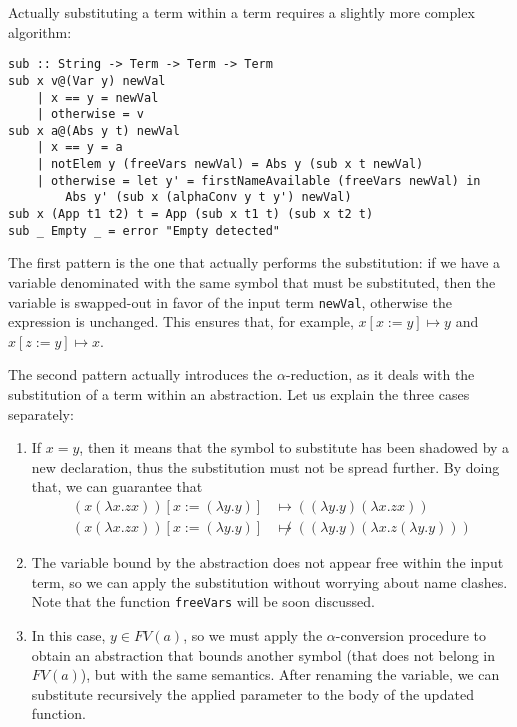 \documentclass{article}
\begin{document}
Actually substituting a term within a term requires a slightly more complex algorithm:

\begin{lstlisting}
sub :: String -> Term -> Term -> Term
sub x v@(Var y) newVal
    | x == y = newVal
    | otherwise = v
sub x a@(Abs y t) newVal
    | x == y = a
    | notElem y (freeVars newVal) = Abs y (sub x t newVal)
    | otherwise = let y' = firstNameAvailable (freeVars newVal) in
        Abs y' (sub x (alphaConv y t y') newVal)
sub x (App t1 t2) t = App (sub x t1 t) (sub x t2 t)
sub _ Empty _ = error "Empty detected"
\end{lstlisting}

The first pattern is the one that actually performs the substitution: if we have a variable denominated with the same symbol that must be substituted, then the variable is swapped-out in favor of the input term \lstinline|newVal|, otherwise the expression is unchanged. This ensures that, for example, $x[x:=y] \mapsto y$ and $x[z:=y] \mapsto x$.

The second pattern actually introduces the $\alpha$-reduction, as it deals with the substitution of a term within an abstraction. Let us explain the three cases separately:

\begin{enumerate}
    \item If $x=y$, then it means that the symbol to substitute has been shadowed by a new declaration, thus the substitution must not be spread further. By doing that, we can guarantee that
    \begin{align*}
        (x (\lambda x . z x))[x := (\lambda y . y)] &\mapsto ((\lambda y . y) (\lambda x . z x))\\
        (x (\lambda x . z x))[x := (\lambda y . y)] &\not \mapsto ((\lambda y . y) (\lambda x . z (\lambda y . y)))
    \end{align*}
    \item The variable bound by the abstraction does not appear free within the input term, so we can apply the substitution without worrying about name clashes. Note that the function \lstinline|freeVars| will be soon discussed.
    \item In this case, $y \in FV(a)$, so we must apply the $\alpha$-conversion procedure to obtain an abstraction that bounds another symbol (that does not belong in $FV(a)$), but with the same semantics. After renaming the variable, we can substitute recursively the applied parameter to the body of the updated function.
\end{enumerate}
\end{document}
